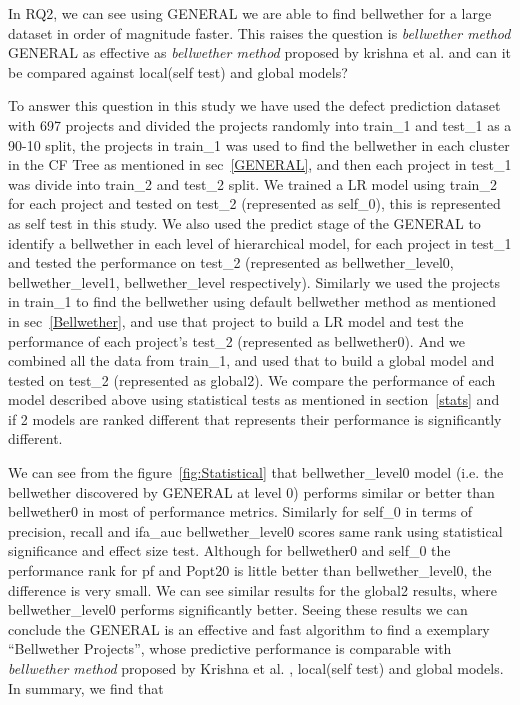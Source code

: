\documentclass[10pt,journal,compsoc]{IEEEtran}
\begin{document}
In RQ2, we can see using GENERAL we are able to find bellwether for a large dataset in order of magnitude faster. This raises the question is  \textit{bellwether method} GENERAL as effective as \textit{bellwether method} proposed by krishna et al. and can it be compared against local(self test) and global models? 

To answer this question in this study we have used the defect prediction dataset with 697 projects and divided the projects randomly into train\_1 and test\_1 as a 90-10 split, the projects in train\_1 was used to find the bellwether in each cluster in the CF Tree as mentioned in sec~\ref{GENERAL}, and then each project in test\_1 was divide into train\_2 and test\_2 split. We trained a LR model using train\_2 for each project and tested on test\_2 (represented as self\_0), this is represented as self test in this study. We also used the predict stage of the GENERAL to identify a bellwether in each level of hierarchical model, for each project in test\_1 and tested the performance on test\_2 (represented as bellwether\_level0, bellwether\_level1, bellwether\_level respectively). Similarly we used the projects in train\_1 to find the bellwether using default bellwether method as mentioned in sec~\ref{Bellwether}, and use that project to build a LR model and test the performance of each project's test\_2 (represented as bellwether0). And we combined all the data from train\_1, and used that to build a global model and tested on test\_2 (represented as global2). We compare the performance of each model described above using statistical tests as mentioned in section~\ref{stats} and if 2 models are ranked different that represents their performance is significantly different. 

We can see from the figure~\ref{fig:Statistical} that bellwether\_level0 model (i.e. the bellwether discovered by GENERAL at level 0) performs similar or  better than bellwether0 in most of performance metrics. Similarly for self\_0 in terms of precision, recall and ifa\_auc bellwether\_level0 scores same rank using statistical significance and effect size test. Although for bellwether0 and self\_0 the performance rank for pf and Popt20 is little better than bellwether\_level0, the difference is very small. We can see similar results for the global2 results, where bellwether\_level0 performs significantly better. Seeing these results we can conclude the GENERAL is an effective and fast algorithm to find a exemplary ``Bellwether Projects'', whose predictive performance is comparable with  \textit{bellwether method} proposed by Krishna et al. , local(self test) and global models. In summary, we find that
\end{document}
